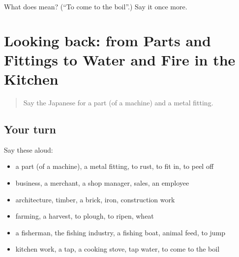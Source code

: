 \begin{tcolorbox}[breakable,colback=teal!4,colframe=teal!35!black,title={Before you move on}]
What does  mean? (\textquotedblleft{}To come to the boil\textquotedblright{}.) Say it once more.
\end{tcolorbox}
\section[(dialogue)]{Looking back: from Parts and Fittings to Water and Fire in the Kitchen}

\label{lesson:JA-R491-review-486-491}



\begin{quote}
Say the Japanese for a part (of a machine) and a metal fitting.
\end{quote}

\subsection*{Your turn}
Say these aloud:

\begin{itemize}
\raggedright
  \item a part (of a machine), a metal fitting, to rust, to fit in, to peel off
  \item business, a merchant, a shop manager, sales, an employee
  \item architecture, timber, a brick, iron, construction work
  \item farming, a harvest, to plough, to ripen, wheat
  \item a fisherman, the fishing industry, a fishing boat, animal feed, to jump
  \item kitchen work, a tap, a cooking stove, tap water, to come to the boil
\end{itemize}

